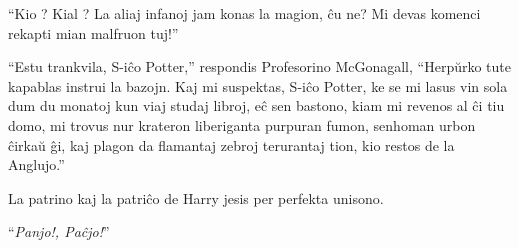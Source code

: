 ``Kio ? Kial ? La aliaj infanoj jam konas la magion, ĉu ne? Mi devas
komenci rekapti mian malfruon tuj!''

``Estu trankvila, S-iĉo Potter,'' respondis Profesorino McGonagall,
``Herpŭrko tute kapablas instrui la bazojn. Kaj mi suspektas, S-iĉo
Potter, ke se mi lasus vin sola dum du monatoj kun viaj studaj libroj,
eĉ sen bastono, kiam mi revenos al ĉi tiu domo, mi trovus nur krateron
liberiganta purpuran fumon, senhoman urbon ĉirkaŭ ĝi, kaj plagon da
flamantaj zebroj terurantaj tion, kio restos de la Anglujo.''

La patrino kaj la patriĉo de Harry jesis per perfekta unisono.

``\emph{Panjo!, Paĉjo!}''
